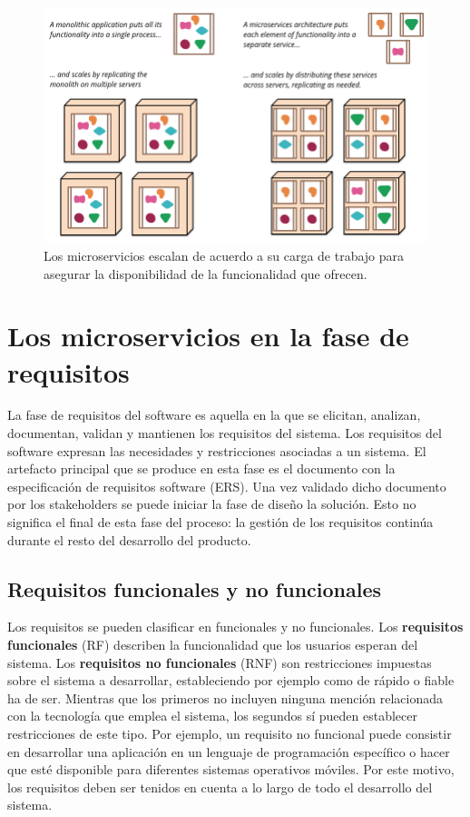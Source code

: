 \documentclass[11pt,spanish,listoffigures,listoftables]{tfgetsinf}
\begin{document}
\begin{figure}[h]
\centering
\includegraphics[scale=0.4]{microservices_escaling}
\caption{Los microservicios escalan de acuerdo a su carga de trabajo para asegurar la disponibilidad de la funcionalidad que ofrecen. \cite{Lewis2014}}
\end{figure}

\section{Los microservicios en la fase de requisitos}

La fase de requisitos del software es aquella en la que se elicitan, analizan, documentan, validan y mantienen los requisitos del sistema. Los requisitos del software expresan las necesidades y restricciones asociadas a un sistema. \cite{Fernandes2016} El artefacto principal que se produce en esta fase es el documento con la especificación de requisitos software (ERS). Una vez validado dicho documento por los stakeholders se puede iniciar la fase de diseño la solución. Esto no significa el final de esta fase del proceso: la gestión de los requisitos continúa durante el resto del desarrollo del producto.

\subsection{Requisitos funcionales y no funcionales}

Los requisitos se pueden clasificar en funcionales y no funcionales. Los \textbf{requisitos funcionales} (RF) describen la funcionalidad que los usuarios esperan del sistema. Los \textbf{requisitos no funcionales} (RNF) son restricciones impuestas sobre el sistema a desarrollar, estableciendo por ejemplo como de rápido o fiable ha de ser. Mientras que los primeros no incluyen ninguna mención relacionada con la tecnología que emplea el sistema, los segundos sí pueden establecer restricciones de este tipo. Por ejemplo, un requisito no funcional puede consistir en desarrollar una aplicación en un lenguaje de programación específico o hacer que esté disponible para diferentes sistemas operativos móviles. Por este motivo, los requisitos deben ser tenidos en cuenta a lo largo de todo el desarrollo del sistema.
\end{document}
